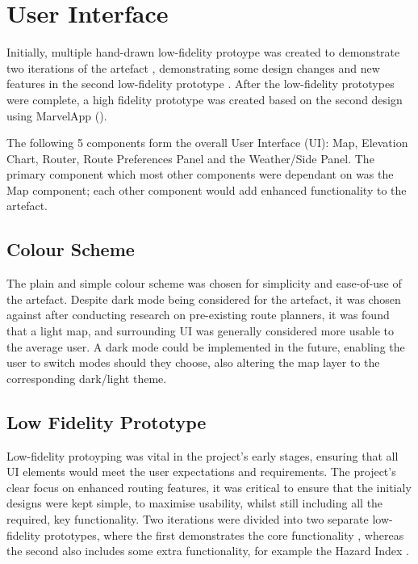 \section{User Interface}
\label{design:ui}
Initially, multiple hand-drawn low-fidelity protoype was created to demonstrate two iterations of the artefact , demonstrating some design changes and new features in the second low-fidelity prototype . After the low-fidelity prototypes were complete, a high fidelity prototype was created based on the second design using MarvelApp (\cite{noauthor_marvel_nodate}).

The following 5 components form the overall User Interface (UI): Map,  Elevation Chart, Router, Route Preferences Panel and the Weather/Side Panel. The primary component which most other components were dependant on was the Map component; each other component would add enhanced functionality to the artefact.

\subsection{Colour Scheme}
\label{ui:colourscheme}

The plain and simple colour scheme was chosen for simplicity and ease-of-use of the artefact. Despite dark mode being considered for the artefact, it was chosen against after conducting research on pre-existing route planners, it was found that a light map, and surrounding UI was generally considered more usable to the average user. A dark mode could be implemented in the future, enabling the user to switch modes should they choose, also altering the map layer to the corresponding dark/light theme.

\subsection{Low Fidelity Prototype}
\label{ui:low-fi}

Low-fidelity protoyping was vital in the project's early stages, ensuring that all UI elements would meet the user expectations and requirements. The project's clear focus on enhanced routing features, it was critical to ensure that the initialy designs were kept simple, to maximise usability, whilst still including all the required, key functionality. Two iterations were divided into two separate low-fidelity prototypes, where the first demonstrates the core functionality , whereas the second also includes some extra functionality, for example the Hazard Index .


